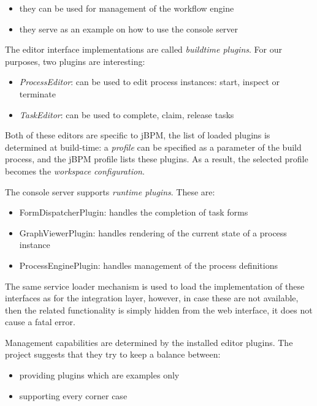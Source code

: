 \begin{itemize}
\item they can be used for management of the workflow engine
\item they serve as an example on how to use the console server
\end{itemize}

The editor interface implementations are called \emph{buildtime plugins}. For our
purposes, two plugins are interesting:

\begin{itemize}
\item \emph{ProcessEditor}: can be used to edit process instances: start, inspect or terminate
\item \emph{TaskEditor}: can be used to complete, claim, release tasks
\end{itemize}

Both of these editors are specific to jBPM, the list of loaded plugins is
determined at build-time: a \emph{profile} can be specified as a parameter of the
build process, and the jBPM profile lists these plugins. As a result, the
selected profile becomes the \emph{workspace configuration}.

The console server supports \emph{runtime plugins}. These are:

\begin{itemize}
\item FormDispatcherPlugin: handles the completion of task forms
\item GraphViewerPlugin: handles rendering of the current state of a process instance
\item ProcessEnginePlugin: handles management of the process definitions
\end{itemize}

The same service loader mechanism is used to load the implementation of these
interfaces as for the integration layer, however, in case these are not
available, then the related functionality is simply hidden from the web
interface, it does not cause a fatal error.


Management capabilities are determined by the installed editor plugins. The
project suggests that they try to keep a balance between:

\begin{itemize}
\item providing plugins which are examples only
\item supporting every corner case
\end{itemize}

